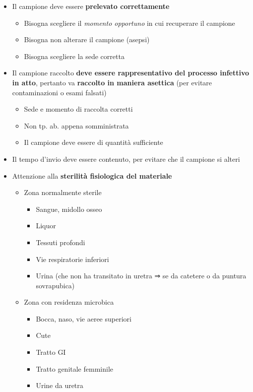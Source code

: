 \documentclass[italian,]{article}
\providecommand{\tightlist}{%
  \setlength{\itemsep}{0pt}\setlength{\parskip}{0pt}}
\begin{document}
\begin{itemize}
\tightlist
\item
  Il campione deve essere \textbf{prelevato correttamente}

  \begin{itemize}
  \tightlist
  \item
    Bisogna scegliere il \emph{momento opportuno} in cui recuperare il
    campione
  \item
    Bisogna non alterare il campione (asepsi)
  \item
    Bisogna scegliere la sede corretta
  \end{itemize}
\item
  Il campione raccolto \textbf{deve essere rappresentativo del processo
  infettivo in atto}, pertanto va \textbf{raccolto in maniera asettica}
  (per evitare contaminazioni o esami falsati)

  \begin{itemize}
  \tightlist
  \item
    Sede e momento di raccolta corretti
  \item
    Non tp. ab. appena somministrata
  \item
    Il campione deve essere di quantità sufficiente
  \end{itemize}
\item
  Il tempo d'invio deve essere contenuto, per evitare che il campione si
  alteri
\item
  Attenzione alla \textbf{sterilità fisiologica del materiale}

  \begin{itemize}
  \tightlist
  \item
    Zona normalmente sterile

    \begin{itemize}
    \tightlist
    \item
      Sangue, midollo osseo
    \item
      Liquor
    \item
      Tessuti profondi
    \item
      Vie respiratorie inferiori
    \item
      Urina (che non ha transitato in uretra ⇒ se da catetere o da
      puntura sovrapubica)
    \end{itemize}
  \item
    Zona con residenza microbica

    \begin{itemize}
    \tightlist
    \item
      Bocca, naso, vie aeree superiori
    \item
      Cute
    \item
      Tratto GI
    \item
      Tratto genitale femminile
    \item
      Urine da uretra
    \end{itemize}
  \end{itemize}
\end{itemize}
\end{document}
